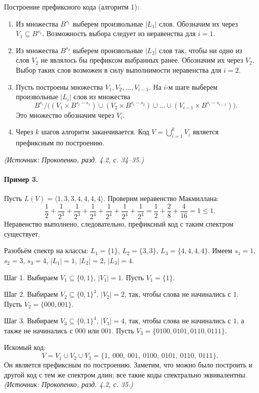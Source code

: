 \documentclass[a4paper,12pt]{article}
\begin{document}
Построение префиксного кода (алгоритм 1):
\begin{enumerate}[label=\arabic*)]
\item Из множества \(B^{s_1}\) выберем произвольные \(|L_1|\) слов. Обозначим их через \(V_1\subseteq B^{s_1}\). Возможность выбора следует из неравенства для \(i=1\).
\item Из множества \(B^{s_2}\) выберем произвольные \(|L_2|\) слов так, чтобы ни одно из слов \(V_2\) не являлось бы префиксом выбранных ранее. Обозначим их через \(V_2\). Выбор таких слов возможен в силу выполнимости неравенства для \(i=2\).
\item Пусть построены множества \(V_1,V_2,\dots,V_{i-1}\). На \(i\)-м шаге выберем произвольные \(|L_i|\) слов из множества
\[
B^{s_i}\big/\bigl((V_1\times B^{s_i-s_1})\cup (V_2\times B^{s_i-s_2})\cup\dots\cup (V_{i-1}\times B^{s_i-s_{i-1}})\bigr).
\]
Это множество обозначим через \(V_i\).
\item Через \(k\) шагов алгоритм заканчивается. Код \(V=\bigcup_{i=1}^k V_i\) является префиксным по построению.
\end{enumerate}
\textit{(Источник: Прокопенко, разд. 4.2, с. 34--35.)}

\paragraph{Пример 3.}
Пусть \(L(V)=\langle1,3,3,4,4,4,4\rangle\). Проверим неравенство Макмиллана:
\[
\frac{1}{2}+\frac{1}{2^3}+\frac{1}{2^3}+\frac{1}{2^4}+\frac{1}{2^4}+\frac{1}{2^4}+\frac{1}{2^4}
=\frac{1}{2}+\frac{2}{8}+\frac{4}{16}=1\le 1.
\]
Неравенство выполнено, следовательно, префиксный код с таким спектром существует.

Разобьём спектр на классы: \(L_1=\{1\}\), \(L_2=\{3,3\}\), \(L_3=\{4,4,4,4\}\). Имеем \(s_1=1\), \(s_2=3\), \(s_3=4\), \(|L_1|=1\), \(|L_2|=2\), \(|L_3|=4\).

Шаг 1. Выбираем \(V_1\subseteq\{0,1\}\), \(|V_1|=1\). Пусть \(V_1=\{1\}\).

Шаг 2. Выбираем \(V_2\subseteq\{0,1\}^3\), \(|V_2|=2\), так, чтобы слова не начинались с \(1\). Пусть \(V_2=\{000,001\}\).

Шаг 3. Выбираем \(V_3\subseteq\{0,1\}^4\), \(|V_3|=4\), так, чтобы слова не начинались с \(1\), а также не начинались с \(000\) или \(001\). Пусть \(V_3=\{0100,0101,0110,0111\}\).

Искомый код:
\[
V=V_1\cup V_2\cup V_3=\{1,\ 000,\ 001,\ 0100,\ 0101,\ 0110,\ 0111\}.
\]
Он является префиксным по построению. Заметим, что можно было построить и другой код с тем же спектром длин; все такие коды спектрально эквивалентны.
\textit{(Источник: Прокопенко, разд. 4.2, с. 35.)}
\end{document}
